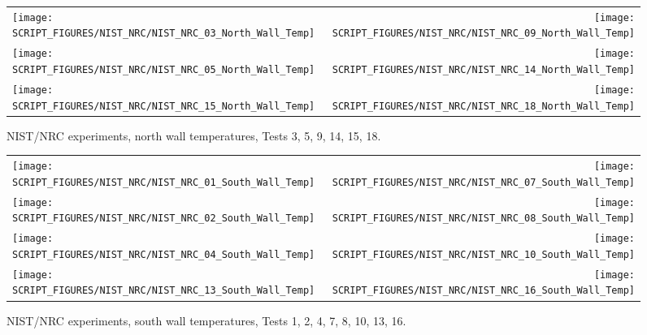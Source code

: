 \begin{figure}[p]
\begin{tabular*}{\textwidth}{l@{\extracolsep{\fill}}r}
\texttt{[image: SCRIPT\_FIGURES/NIST\_NRC/NIST\_NRC\_03\_North\_Wall\_Temp]} &
\texttt{[image: SCRIPT\_FIGURES/NIST\_NRC/NIST\_NRC\_09\_North\_Wall\_Temp]} \\
\texttt{[image: SCRIPT\_FIGURES/NIST\_NRC/NIST\_NRC\_05\_North\_Wall\_Temp]} &
\texttt{[image: SCRIPT\_FIGURES/NIST\_NRC/NIST\_NRC\_14\_North\_Wall\_Temp]} \\
\texttt{[image: SCRIPT\_FIGURES/NIST\_NRC/NIST\_NRC\_15\_North\_Wall\_Temp]} &
\texttt{[image: SCRIPT\_FIGURES/NIST\_NRC/NIST\_NRC\_18\_North\_Wall\_Temp]}
\end{tabular*}
\caption[NIST/NRC experiments, north wall temperatures, Tests 3, 5, 9, 14, 15, 18]{NIST/NRC experiments, north wall temperatures, Tests 3, 5, 9, 14, 15, 18.}
\label{NIST_NRC_North_Wall_Temp_Open}
\end{figure}

\begin{figure}[p]
\begin{tabular*}{\textwidth}{l@{\extracolsep{\fill}}r}
\texttt{[image: SCRIPT\_FIGURES/NIST\_NRC/NIST\_NRC\_01\_South\_Wall\_Temp]} &
\texttt{[image: SCRIPT\_FIGURES/NIST\_NRC/NIST\_NRC\_07\_South\_Wall\_Temp]} \\
\texttt{[image: SCRIPT\_FIGURES/NIST\_NRC/NIST\_NRC\_02\_South\_Wall\_Temp]} &
\texttt{[image: SCRIPT\_FIGURES/NIST\_NRC/NIST\_NRC\_08\_South\_Wall\_Temp]} \\
\texttt{[image: SCRIPT\_FIGURES/NIST\_NRC/NIST\_NRC\_04\_South\_Wall\_Temp]} &
\texttt{[image: SCRIPT\_FIGURES/NIST\_NRC/NIST\_NRC\_10\_South\_Wall\_Temp]} \\
\texttt{[image: SCRIPT\_FIGURES/NIST\_NRC/NIST\_NRC\_13\_South\_Wall\_Temp]} &
\texttt{[image: SCRIPT\_FIGURES/NIST\_NRC/NIST\_NRC\_16\_South\_Wall\_Temp]}
\end{tabular*}
\caption[NIST/NRC experiments, south wall temperatures, Tests 1, 2, 4, 7, 8, 10, 13, 16]{NIST/NRC experiments, south wall temperatures, Tests 1, 2, 4, 7, 8, 10, 13, 16.}
\label{NIST_NRC_South_Wall_Temp_Closed}
\end{figure}

